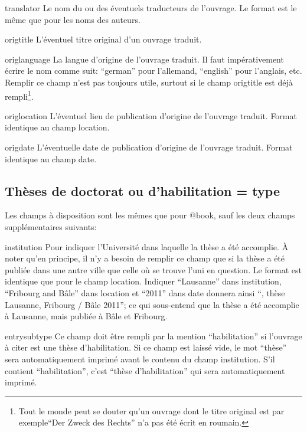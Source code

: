 \documentclass[a4paper]{ltxdockit}[2011/03/25]
\newcommand{\GM}{\enquote}
\newcommand{\pex}{\textnormal{par exemple}\xspace}
\begin{document}
\begin{marglist}
\item[translator]\label{translator}Le nom du ou des éventuels traducteurs de l'ouvrage. Le format est le même que pour les noms des auteurs.

\item[origtitle]\label{origtitle}L'éventuel titre original d'un ouvrage traduit.

\item[origlanguage]\label{origlanguage}La langue d'origine de l'ouvrage traduit. Il faut impérativement écrire le nom comme suit: \GM{german} pour l'allemand, \GM{english} pour l'anglais, etc. Remplir ce champ n'est pas toujours utile, surtout si le champ origtitle est déjà rempli\footnote{Tout le monde peut se douter qu'un ouvrage dont le titre original est \pex \GM{Der Zweck des Rechts} n'a pas été écrit en roumain.}.

\item[origlocation]\label{origlocation}L'éventuel lieu de publication d'origine de l'ouvrage traduit. Format identique au champ location.

\item[origdate]\label{origdate}L'éventuelle date de publication d'origine de l'ouvrage traduit. Format identique au champ date.

\end{marglist}


\subsection{Thèses de doctorat ou d'habilitation = type }

Les champs à disposition sont les mêmes que pour @book, sauf les deux champs supplémentaires suivants:
\begin{marglist}
\item[institution]
Pour indiquer l'Université dans laquelle la thèse a été accomplie. À noter qu'en principe, il n'y a besoin de remplir ce champ que si la thèse a été publiée dans une autre ville que celle où se trouve l'uni en question. Le format est identique que pour le champ location.
Indiquer \GM{Lausanne} dans institution, \GM{Fribourg and Bâle} dans location et \GM{2011} dans date donnera ainsi \GM{\bibellipsis, thèse Lausanne, Fribourg / Bâle 2011}; ce qui sous-entend que la thèse a été accomplie à Lausanne, mais publiée à Bâle et Fribourg.
\item[entrysubtype]
Ce champ doit être rempli par la mention \GM{habilitation} si l'ouvrage à citer est une thèse d'habilitation. Si ce champ est laissé vide, le mot \GM{thèse} sera automatiquement imprimé avant le contenu du champ institution. S'il contient \GM{habilitation}, c'est \GM{thèse d'habilitation} qui sera automatiquement imprimé.
\end{marglist}
\end{document}
